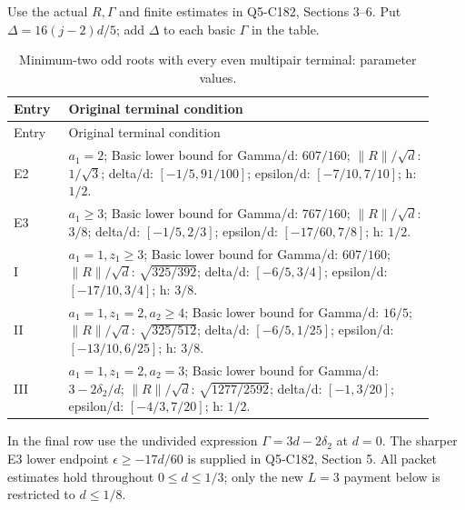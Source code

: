 Use the actual \(R,\allowbreak \allowbreak  \Gamma\) and finite estimates in Q5-C182, Sections 3--6. Put \(\Delta=16(j-2)d/5\); add \(\Delta\) to each basic \(\Gamma\) in the table.


\begingroup\small
\setlength{\tabcolsep}{3pt}
\setlength{\LTleft}{0pt}\setlength{\LTright}{\fill}
\begin{longtable}{@{}p{0.1200\linewidth}p{0.8000\linewidth}@{}}
\caption{Minimum-two odd roots with every even multipair terminal: parameter values.}\label{tab:parameters:r2-c003:2}\\
\toprule
Entry & Original terminal condition \\
\midrule\endfirsthead
\toprule
Entry & Original terminal condition \\
\midrule\endhead
\bottomrule\endfoot
E2 & \(a_1=2\); Basic lower bound for Gamma/d: \(607/160\); \(\|R\|/\sqrt{d}\): \(1/\sqrt{3}\); delta/d: \([-1/5,\allowbreak 91/100]\); epsilon/d: \([-7/10,\allowbreak 7/10]\); h: \(1/2\). \\
\addlinespace[2pt]
E3 & \(a_1\ge 3\); Basic lower bound for Gamma/d: \(767/160\); \(\|R\|/\sqrt{d}\): \(3/8\); delta/d: \([-1/5,\allowbreak 2/3]\); epsilon/d: \([-17/60,\allowbreak 7/8]\); h: \(1/2\). \\
\addlinespace[2pt]
I & \(a_1=1,\allowbreak z_1\ge 3\); Basic lower bound for Gamma/d: \(607/160\); \(\|R\|/\sqrt{d}\): \(\sqrt{325/392}\); delta/d: \([-6/5,\allowbreak 3/4]\); epsilon/d: \([-17/10,\allowbreak 3/4]\); h: \(3/8\). \\
\addlinespace[2pt]
II & \(a_1=1,\allowbreak z_1=2,\allowbreak a_2\ge 4\); Basic lower bound for Gamma/d: \(16/5\); \(\|R\|/\sqrt{d}\): \(\sqrt{325/512}\); delta/d: \([-6/5,\allowbreak 1/25]\); epsilon/d: \([-13/10,\allowbreak 6/25]\); h: \(3/8\). \\
\addlinespace[2pt]
III & \(a_1=1,\allowbreak z_1=2,\allowbreak a_2=3\); Basic lower bound for Gamma/d: \(3-2\delta_2/d\); \(\|R\|/\sqrt{d}\): \(\sqrt{1277/2592}\); delta/d: \([-1,\allowbreak 3/20]\); epsilon/d: \([-4/3,\allowbreak 7/20]\); h: \(1/2\). \\
\end{longtable}
\endgroup


In the final row use the undivided expression \(\Gamma=3d-2 \delta_2\) at \(d=0\). The sharper E3 lower endpoint \(\epsilon\ge-17d/60\) is supplied in Q5-C182, Section 5. All packet estimates hold throughout \(0\le d\le1/3\); only the new \(L=3\) payment below is restricted to \(d\le1/8\).


